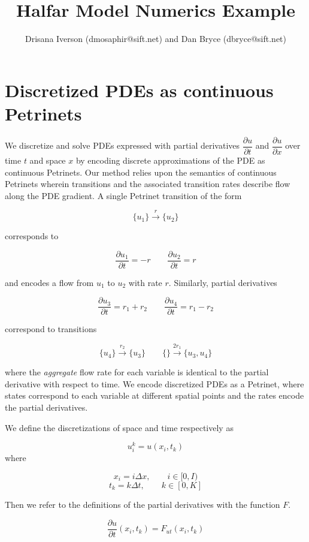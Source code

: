 \documentclass{article}
\title{Halfar Model Numerics Example}
\author{Drisana Iverson (dmosaphir@sift.net) and Dan Bryce (dbryce@sift.net)}
\begin{document}
\maketitle


\section{Discretized PDEs as continuous Petrinets}

We discretize and solve PDEs expressed with partial derivatives $\dfrac{\partial
        u}{\partial t}$ and  $\dfrac{\partial u}{\partial x}$ over time $t$ and space
$x$ by encoding discrete approximations of the PDE as continuous Petrinets.  Our
method relies upon the semantics of continuous Petrinets wherein transitions and
the associated transition rates describe flow along the PDE gradient. A single
Petrinet transition of the form

$$\{u_1\}\xrightarrow{r}\{u_2\}$$

\noindent corresponds to

$$\dfrac{\partial u_1}{\partial t}  = -r \qquad \dfrac{\partial u_2}{\partial t}
    = r$$

\noindent and encodes a flow from $u_1$ to $u_2$ with rate $r$.  Similarly,
partial derivatives

$$\dfrac{\partial u_3}{\partial t} = r_1 + r_2  \qquad \dfrac{\partial
        u_4}{\partial t} = r_1 - r_2$$

\noindent correspond to transitions

$$\{u_4\}\xrightarrow{r_2}\{u_3\} \qquad \{\}\xrightarrow{2 r_1}\{u_3, u_4\}$$

\noindent where the \emph{aggregate} flow rate for each variable is identical to
the partial derivative with respect to time.  We encode discretized PDEs as a
Petrinet, where states correspond to each variable at different spatial points
and the rates encode the partial derivatives.

We define the discretizations of space and time respectively as

\[ u_i^k = u(x_i, t_k) \] where

\[x_i = i\Delta x, \qquad i \in [0, I) \] \[t_k = k\Delta t, \qquad k \in [0,
        K]\]

\noindent Then we refer to the definitions of the partial derivatives with the
function $F$.

\begin{equation} \label{eq:first_deriv_time}
    \dfrac{\partial u}{\partial t}(x_i, t_k)= F_{ut}(x_i,t_k)%
\end{equation}
\end{document}
